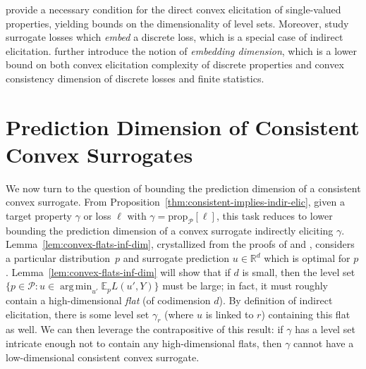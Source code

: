 \documentclass[11pt]{article} %
\newcommand{\Comments}{1}
\newcommand{\mytodo}[2]{\ifnum\Comments=1%
	\todo[linecolor=#1!80!black,backgroundcolor=#1,bordercolor=#1!80!black]{#2}\fi}
\newcommand{\btw}[1]{}%
\newcommand{\reals}{\mathbb{R}}
\newcommand{\prop}[2][\mathcal{P}]{\mathrm{prop}_{#1}[#2]}
\newcommand{\E}{\mathbb{E}}
\renewcommand{\P}{\mathcal{P}}
\newcommand{\exploss}[3]{\E_{#3} #1(#2,Y)}
\DeclareMathOperator*{\argmin}{arg\,min}
\begin{document}
\citet[Corollary 10]{agarwal2015consistent} provide a necessary condition for the direct convex elicitation of single-valued properties, yielding bounds on the dimensionality of level sets.
Moreover, \citet{finocchiaro2019embedding} study surrogate losses which \emph{embed} a discrete loss, which is a special case of indirect elicitation.
\citet{finocchiaro2020embedding} further introduce the notion of \emph{embedding dimension}, which is a lower bound on both convex elicitation complexity of discrete properties and convex consistency dimension of discrete losses and finite statistics.




\section{Prediction Dimension of Consistent Convex Surrogates}\label{sec:char-convex}
We now turn to the question of bounding the prediction dimension of a consistent convex surrogate.
From Proposition~\ref{thm:consistent-implies-indir-elic}, given a target property $\gamma$ or loss $\ell$ with $\gamma = \prop{\ell}$, this task reduces to lower bounding the prediction dimension of a convex surrogate indirectly eliciting $\gamma$.
Lemma~\ref{lem:convex-flats-inf-dim}, crystallized from the proofs of \citet[Theorem 16]{ramaswamy2016convex} and \citet[Theorem 9]{agarwal2015consistent}, considers a particular distribution~$p$ and surrogate prediction $u \in \reals^d$ which is optimal for $p$.
Lemma~\ref{lem:convex-flats-inf-dim} will show that if $d$ is small, then the level set $\{p \in \P : u \in \argmin_{u'} \exploss{L}{u'}{p}\}$ must be large; in fact, it must roughly contain a high-dimensional \emph{flat} (of codimension $d$).
By definition of indirect elicitation, there is some level set $\gamma_r$ (where $u$ is linked to $r$) containing this flat as well.
We can then leverage the contrapositive of this result: if $\gamma$ has a level set intricate enough not to contain any high-dimensional flats, then $\gamma$ cannot have a low-dimensional consistent convex surrogate.
\end{document}
